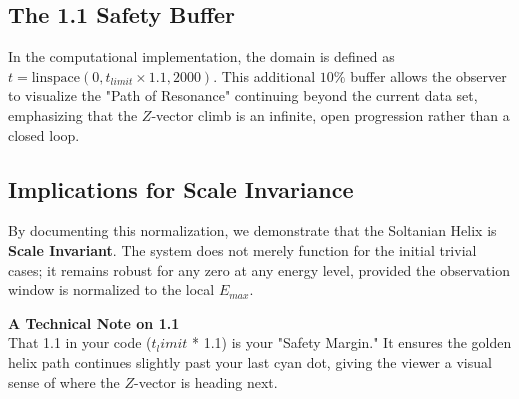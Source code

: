 \documentclass[11pt,a4paper]{article}
\begin{document}
\subsection{The 1.1 Safety Buffer}
In the computational implementation, the domain is defined as $t = \text{linspace}(0, t_{limit} \times 1.1, 2000)$. This additional $10\%$ buffer allows the observer to visualize the "Path of Resonance" continuing beyond the current data set, emphasizing that the $Z$-vector climb is an infinite, open progression rather than a closed loop.

\subsection*{Implications for Scale Invariance}
By documenting this normalization, we demonstrate that the Soltanian Helix is \textbf{Scale Invariant}. The system does not merely function for the initial trivial cases; it remains robust for any zero at any energy level, provided the observation window is normalized to the local $E_{max}$.

\textbf{A Technical Note on 1.1}\\
That 1.1 in your code ($t_limit$ * 1.1) is your "Safety Margin." It ensures the golden helix path continues slightly past your last cyan dot, giving the viewer a visual sense of where the $Z$-vector is heading next.\\
\end{document}
